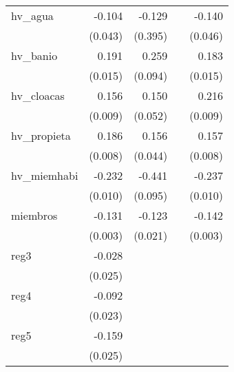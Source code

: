 {\begin{longtable}{l*{4}{D{.}{.}{-1}}}
\addlinespace
hv\_agua     &      -0.104\sym{*}  &      -0.129         &                     &      -0.140\sym{**} \\
            &     (0.043)         &     (0.395)         &                     &     (0.046)         \\
\addlinespace
hv\_banio    &       0.191\sym{***}&       0.259\sym{**} &                     &       0.183\sym{***}\\
            &     (0.015)         &     (0.094)         &                     &     (0.015)         \\
\addlinespace
hv\_cloacas  &       0.156\sym{***}&       0.150\sym{**} &                     &       0.216\sym{***}\\
            &     (0.009)         &     (0.052)         &                     &     (0.009)         \\
\addlinespace
hv\_propieta &       0.186\sym{***}&       0.156\sym{***}&                     &       0.157\sym{***}\\
            &     (0.008)         &     (0.044)         &                     &     (0.008)         \\
\addlinespace
hv\_miemhabi &      -0.232\sym{***}&      -0.441\sym{***}&                     &      -0.237\sym{***}\\
            &     (0.010)         &     (0.095)         &                     &     (0.010)         \\
\addlinespace
miembros    &      -0.131\sym{***}&      -0.123\sym{***}&                     &      -0.142\sym{***}\\
            &     (0.003)         &     (0.021)         &                     &     (0.003)         \\
\addlinespace
reg3        &      -0.028         &                     &                     &                     \\
            &     (0.025)         &                     &                     &                     \\
\addlinespace
reg4        &      -0.092\sym{***}&                     &                     &                     \\
            &     (0.023)         &                     &                     &                     \\
\addlinespace
reg5        &      -0.159\sym{***}&                     &                     &                     \\
            &     (0.025)         &                     &                     &                     \\

\end{longtable}}

